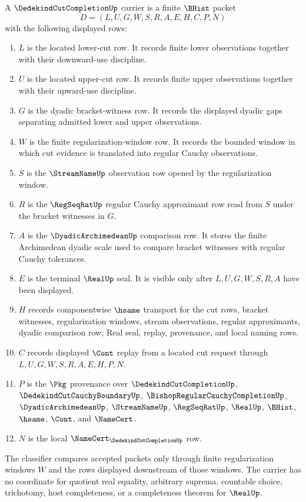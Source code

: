\begin{definition}
\label{def:dedekind-cut-completion-carrier}
A $\DedekindCutCompletionUp$ carrier is a finite $\BHist$ packet
$$
D=(L,U,G,W,S,R,A,E,H,C,P,N)
$$
with the following displayed rows:
\begin{enumerate}
\item $L$ is the located lower-cut row. It records finite lower observations together with their downward-use discipline.
\item $U$ is the located upper-cut row. It records finite upper observations together with their upward-use discipline.
\item $G$ is the dyadic bracket-witness row. It records the displayed dyadic gaps separating admitted lower and upper observations.
\item $W$ is the finite regularization-window row. It records the bounded window in which cut evidence is translated into regular Cauchy observations.
\item $S$ is the $\StreamNameUp$ observation row opened by the regularization window.
\item $R$ is the $\RegSeqRatUp$ regular Cauchy approximant row read from $S$ under the bracket witnesses in $G$.
\item $A$ is the $\DyadicArchimedeanUp$ comparison row. It stores the finite Archimedean dyadic scale used to compare bracket witnesses with regular Cauchy tolerances.
\item $E$ is the terminal $\RealUp$ seal. It is visible only after $L,U,G,W,S,R,A$ have been displayed.
\item $H$ records componentwise $\hsame$ transport for the cut rows, bracket witnesses, regularization windows, stream observations, regular approximants, dyadic comparison row, Real seal, replay, provenance, and local naming rows.
\item $C$ records displayed $\Cont$ replay from a located cut request through $L,U,G,W,S,R,A,E,H,P,N$.
\item $P$ is the $\Pkg$ provenance over $\DedekindCutCompletionUp$, $\DedekindCutCauchyBoundaryUp$, $\BishopRegularCauchyCompletionUp$, $\DyadicArchimedeanUp$, $\StreamNameUp$, $\RegSeqRatUp$, $\RealUp$, $\BHist$, $\hsame$, $\Cont$, and $\NameCert$.
\item $N$ is the local $\NameCert_{\DedekindCutCompletionUp}$ row.
\end{enumerate}
The classifier compares accepted packets only through finite regularization windows $W$ and the rows displayed downstream of those windows. The carrier has no coordinate for quotient real equality, arbitrary suprema, countable choice, trichotomy, host completeness, or a completeness theorem for $\RealUp$.
\end{definition}

